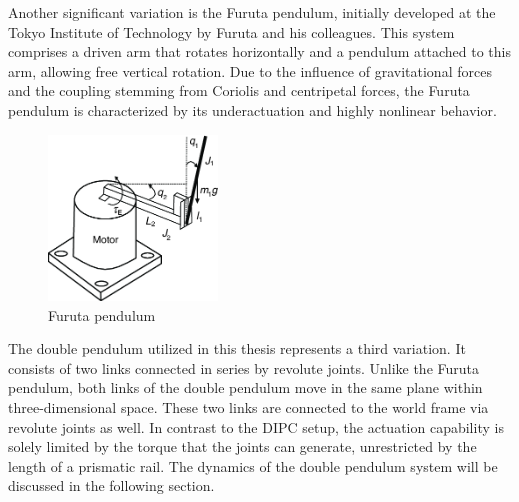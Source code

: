 Another significant variation is the Furuta pendulum\cite{cazzolato2011dynamics}, initially developed at the Tokyo Institute of Technology by Furuta and his colleagues\cite{furuta1992swing}. This system comprises a driven arm that rotates horizontally and a pendulum attached to this arm, allowing free vertical rotation. Due to the influence of gravitational forces and the coupling stemming from Coriolis and centripetal forces, the Furuta pendulum is characterized by its underactuation and highly nonlinear behavior.

\begin{figure}[H]
  \centering
  \includegraphics[width=0.4\textwidth]{figures/Furuta-pendulum.png} %
  \caption{Furuta pendulum\cite{aguilar2010direct}}
  \label{fig:Furuta pendulum}
\end{figure}

The double pendulum utilized in this thesis represents a third variation. It consists of two links connected in series by revolute joints. Unlike the Furuta pendulum, both links of the double pendulum move in the same plane within three-dimensional space. These two links are connected to the world frame via revolute joints as well. In contrast to the DIPC setup, the actuation capability is solely limited by the torque that the joints can generate, unrestricted by the length of a prismatic rail. The dynamics of the double pendulum system will be discussed in the following section.

